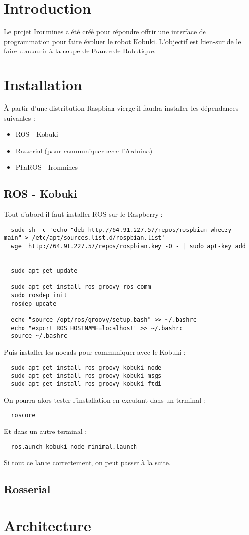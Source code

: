 \documentclass[a4paper, 11pt]{article}
\begin{document}
\section{Introduction}

Le projet Ironmines a été créé pour répondre offrir une interface de
programmation pour faire évoluer le robot Kobuki. L'objectif est
bien-sur de le faire concourir à la coupe de France de Robotique.

\section{Installation}

À partir d'une distribution Raspbian vierge il faudra installer les
dépendances suivantes :
\begin{itemize}
\item ROS - Kobuki
\item Rosserial (pour communiquer avec l'Arduino)
\item PhaROS - Ironmines
\end{itemize}

\subsection{ROS - Kobuki}

Tout d'abord il faut installer ROS sur le Raspberry : 

\begin{lstlisting}
  sudo sh -c 'echo "deb http://64.91.227.57/repos/rospbian wheezy main" > /etc/apt/sources.list.d/rospbian.list'
  wget http://64.91.227.57/repos/rospbian.key -O - | sudo apt-key add -

  sudo apt-get update

  sudo apt-get install ros-groovy-ros-comm
  sudo rosdep init
  rosdep update

  echo "source /opt/ros/groovy/setup.bash" >> ~/.bashrc
  echo "export ROS_HOSTNAME=localhost" >> ~/.bashrc
  source ~/.bashrc
\end{lstlisting}

Puis installer les noeuds pour communiquer avec le Kobuki : 

\begin{lstlisting}
  sudo apt-get install ros-groovy-kobuki-node 
  sudo apt-get install ros-groovy-kobuki-msgs
  sudo apt-get install ros-groovy-kobuki-ftdi
\end{lstlisting}

On pourra alors tester l'installation en excutant dans un terminal :

\begin{verbatim}
  roscore
\end{verbatim}

Et dans un autre terminal : 

\begin{verbatim}
  roslaunch kobuki_node minimal.launch
\end{verbatim}

Si tout ce lance correctement, on peut passer à la suite.

\subsection{Rosserial}
  
\section{Architecture}
\end{document}
